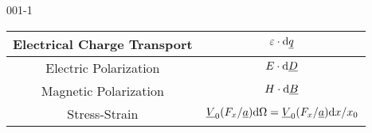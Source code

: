 \begin{mitframe}{001-1}
{\begin{longtable}{ | c | c | }
		Electrical Charge Transport & $\elecpot \cdot \mathrm{d}\eleccharge$ \\ \hline        
	
		Electric Polarization & $\elecfield \cdot \mathrm{d}\uline{\elecdisplace}$ \\ \hline            
	            
		Magnetic Polarization & $\magfield \cdot \mathrm{d}\magind$ \\ \hline      
     
		Stress-Strain & $\origvol(\force_{\disp}/\totalsa)\mathrm{d}\linstrain = \origvol(\force_{\disp}/\totalsa)\mathrm{d}\disp/\disp_{\init} $ \\ \hline       
    
    
	\end{longtable}
	}
    
\end{mitframe}